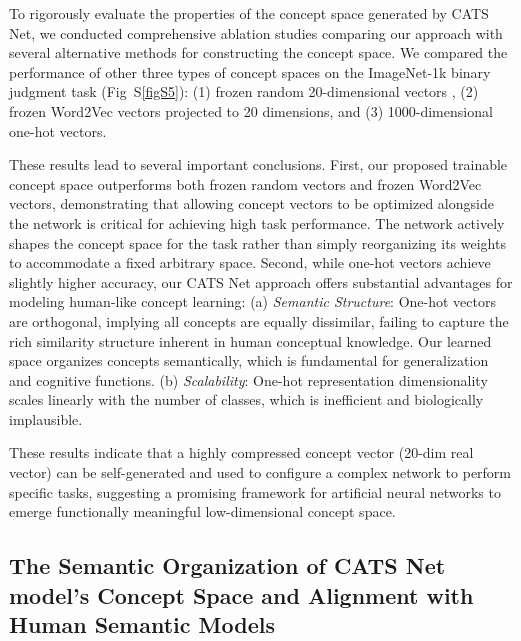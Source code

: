 \documentclass[pdflatex,sn-mathphys-num,lineno]{sn-jnl}%
\begin{document}
\begin{CJK}{UTF8}{gbsn}
To rigorously evaluate the properties of the concept space generated by CATS Net, we conducted comprehensive ablation studies comparing our approach with several alternative methods for constructing the concept space. We compared the performance of other three types of concept spaces on the ImageNet-1k binary judgment task (Fig~S\ref{figS5}): (1) frozen random 20-dimensional vectors , (2) frozen Word2Vec vectors projected to 20 dimensions, and (3) 1000-dimensional one-hot vectors.

These results lead to several important conclusions. First, our proposed trainable concept space outperforms both frozen random vectors and frozen Word2Vec vectors, demonstrating that allowing concept vectors to be optimized alongside the network is critical for achieving high task performance. The network actively shapes the concept space for the task rather than simply reorganizing its weights to accommodate a fixed arbitrary space. Second, while one-hot vectors achieve slightly higher accuracy, our CATS Net approach offers substantial advantages for modeling human-like concept learning: (a) \textit{Semantic Structure}: One-hot vectors are orthogonal, implying all concepts are equally dissimilar, failing to capture the rich similarity structure inherent in human conceptual knowledge. Our learned space organizes concepts semantically, which is fundamental for generalization and cognitive functions. (b) \textit{Scalability}: One-hot representation dimensionality scales linearly with the number of classes, which is inefficient and biologically implausible. 

These results indicate that a highly compressed concept vector (20-dim real vector) can be self-generated and used to configure a complex network to perform specific tasks, suggesting a promising framework for artificial neural networks to emerge functionally meaningful low-dimensional concept space. 

\subsection{The Semantic Organization of CATS Net model’s Concept Space and Alignment with Human Semantic Models}\label{subsec_space_prop} 


\end{CJK}
\end{document}
